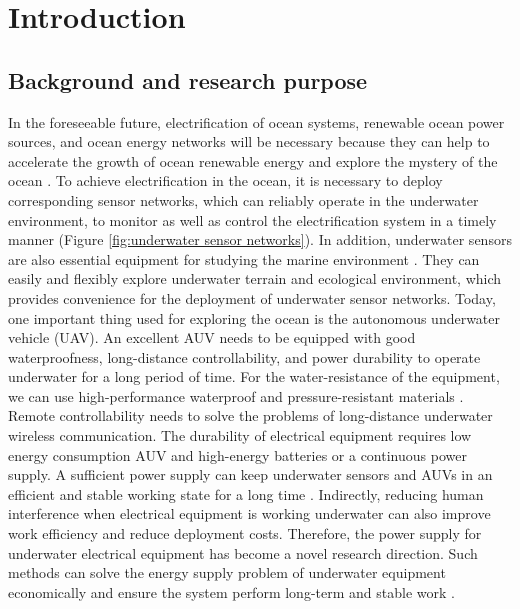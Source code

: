 \chapter{Introduction}
\section{Background and research purpose}
In the foreseeable future, electrification of ocean systems, renewable ocean power sources, and ocean energy networks will be necessary because they can help to accelerate the growth of ocean renewable energy and explore the mystery of the ocean \cite{Orekan, Randhawa2015}.
To achieve electrification in the ocean, it is necessary to deploy corresponding sensor networks, which can reliably operate in the underwater environment, %
to monitor as well as control the electrification system in a timely manner (Figure \ref{fig:underwater sensor networks}).
In addition, underwater sensors are also essential equipment for studying the marine environment \cite{Heidemann2012, Wu2020}.
They can easily and flexibly explore underwater terrain and ecological environment, which provides convenience for the deployment of underwater sensor networks.
Today, one important thing used for exploring the ocean is the autonomous underwater vehicle (UAV).
An excellent AUV needs to be equipped with good waterproofness, long-distance controllability, and power durability to operate underwater for a long period of time. For the water-resistance of the equipment, we can use high-performance waterproof and pressure-resistant materials \cite{Hwang2019, Tran2020, Bradley2001, Wynn2014}.
Remote controllability needs to solve the problems of long-distance underwater wireless communication.
The durability of electrical equipment requires low energy consumption AUV and high-energy batteries or a continuous power supply.
A sufficient power supply can keep underwater sensors and AUVs in an efficient and stable working state for a long time \cite{Jurdak2006}.
Indirectly, reducing human interference when electrical equipment is working underwater can also improve work efficiency and reduce deployment costs.
Therefore, the power supply for underwater electrical equipment has become a novel research direction.
Such methods can solve the energy supply problem of underwater equipment economically and ensure the system perform long-term and stable work \cite{Taormina2018, Hahn2015}.

